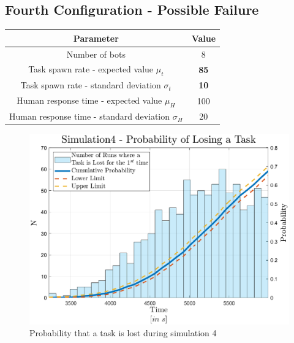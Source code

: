 \documentclass[10pt,a4paper]{article}
\begin{document}
		\subsection{Fourth Configuration - Possible Failure}
			\begin{center}
				\begin{tabular}{ |c|c|}
					\hline
					Parameter & Value\\
					\hline
					\hline
					Number of bots & 8\\
					\hline
					Task spawn rate - expected value $\mu_t$ & \textbf{85}\\
					\hline					
					Task spawn rate - standard deviation $\sigma_t$ & \textbf{10}\\
					\hline
					Human response time - expected value $\mu_H$ & 100\\
					\hline					
					Human response time - standard deviation $\sigma_H$ & 20\\
					\hline
				\end{tabular}
			\end{center}
			\begin{figure}[H]
				\centering
					\includegraphics[scale = 0.6]{Images/Simulation4}
					\caption{Probability that a task is lost during simulation 4}
					\label{fig:sim4}
			\end{figure}
	
\end{document}
